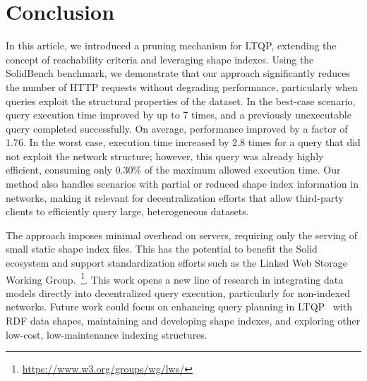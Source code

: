 \section{Conclusion}\label{sec:conclusion}

In this article, we introduced a pruning mechanism for LTQP, extending the concept of reachability criteria and leveraging shape indexes. 
Using the SolidBench benchmark, we demonstrate that our approach significantly reduces the number of HTTP requests without degrading performance, particularly when queries exploit the structural properties of the dataset.
In the best-case scenario, query execution time improved by up to 7 times, and a previously unexecutable query completed successfully.
On average, performance improved by a factor of 1.76.
In the worst case, execution time increased by 2.8 times for a query that did not exploit the network structure; however, this query was already highly efficient, consuming only 0.30\% of the maximum allowed execution time.
Our method also handles scenarios with partial or reduced shape index information in networks, making it relevant for decentralization efforts that allow third-party clients to efficiently query large, heterogeneous datasets.

The approach imposes minimal overhead on servers, requiring only the serving of small static shape index files. 
This has the potential to benefit the Solid ecosystem
and support standardization efforts such as the Linked Web Storage Working Group.~\footnote{\url{https://www.w3.org/groups/wg/lws/}}.
This work opens a new line of research in integrating data models directly into decentralized query execution, particularly for non-indexed networks. 
Future work could focus on enhancing query planning in LTQP~\cite{taelman2024towards} with RDF data shapes, 
maintaining and developing shape indexes, and exploring other low-cost, low-maintenance indexing structures.




